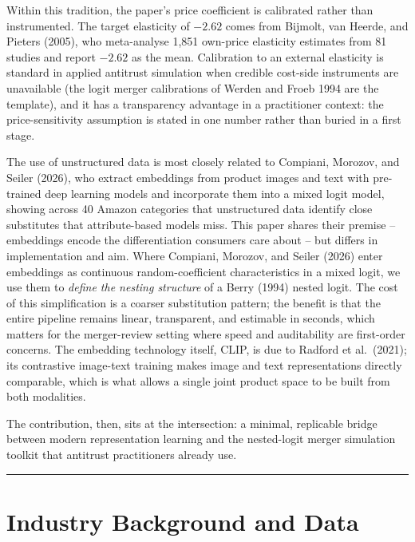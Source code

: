 Within this tradition, the paper's price coefficient is calibrated
rather than instrumented. The target elasticity of \(-2.62\) comes from
Bijmolt, van Heerde, and Pieters (2005), who meta-analyse 1,851
own-price elasticity estimates from 81 studies and report \(-2.62\) as
the mean. Calibration to an external elasticity is standard in applied
antitrust simulation when credible cost-side instruments are unavailable
(the logit merger calibrations of Werden and Froeb 1994 are the
template), and it has a transparency advantage in a practitioner
context: the price-sensitivity assumption is stated in one number rather
than buried in a first stage.

The use of unstructured data is most closely related to Compiani,
Morozov, and Seiler (2026), who extract embeddings from product images
and text with pre-trained deep learning models and incorporate them into
a mixed logit model, showing across 40 Amazon categories that
unstructured data identify close substitutes that attribute-based models
miss. This paper shares their premise -- embeddings encode the
differentiation consumers care about -- but differs in implementation
and aim. Where Compiani, Morozov, and Seiler (2026) enter embeddings as
continuous random-coefficient characteristics in a mixed logit, we use
them to \emph{define the nesting structure} of a Berry (1994) nested
logit. The cost of this simplification is a coarser substitution
pattern; the benefit is that the entire pipeline remains linear,
transparent, and estimable in seconds, which matters for the
merger-review setting where speed and auditability are first-order
concerns. The embedding technology itself, CLIP, is due to Radford et
al.~(2021); its contrastive image-text training makes image and text
representations directly comparable, which is what allows a single joint
product space to be built from both modalities.

The contribution, then, sits at the intersection: a minimal, replicable
bridge between modern representation learning and the nested-logit
merger simulation toolkit that antitrust practitioners already use.

\begin{center}\rule{0.5\linewidth}{0.5pt}\end{center}

\chapter{Industry Background and
Data}\label{industry-background-and-data}

